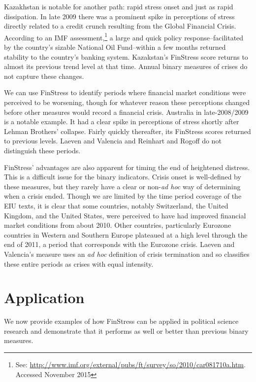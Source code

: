 \documentclass[]{article}
\begin{document}
Kazakhstan is notable for another path: rapid stress onset and just as rapid dissipation. In late 2009 there was a prominent spike in perceptions of stress directly related to a credit crunch resulting from the Global Financial Crisis. According to an IMF assessment,\footnote{See: \url{http://www.imf.org/external/pubs/ft/survey/so/2010/car081710a.htm}. Accessed November 2015} a large and quick policy response--facilitated by the country's sizable National Oil Fund--within a few months returned stability to the country's banking system. Kazakstan's FinStress score returns to almost its previous trend level at that time. Annual binary measures of crises do not capture these changes.

We can use FinStress to identify periods where financial market conditions were perceived to be worsening, though for whatever reason these perceptions changed before other measures would record a financial crisis. Australia in late-2008/2009 is a notable example. It had a clear spike in perceptions of stress shortly after Lehman Brothers' collapse. Fairly quickly thereafter, its FinStress scores returned to previous levels. Laeven and Valencia and Reinhart and Rogoff do not distinguish these periods.

FinStress' advantages are also apparent for timing the end of heightened  distress. This is a difficult issue for the binary indicators. Crisis onset is well-defined by these measures, but they rarely have a clear or non-\emph{ad hoc} way of determining when a crisis ended. Though we are limited by the time period coverage of the EIU texts, it is clear that some countries, notably Switzerland, the United Kingdom, and the United States, were perceived to have had improved financial market conditions from about 2010. Other countries, particularly Eurozone countries in Western and Southern Europe plateaued at a high level through the end of 2011, a period that corresponds with the Eurozone crisis. Laeven and Valencia's measure uses an \emph{ad hoc} definition of crisis termination and so classifies these entire periods as crises with equal intensity.

\section{Application}

We now provide examples of how FinStress can be applied in political science research and demonstrate that it performs as well or better than previous binary measures.
\end{document}

